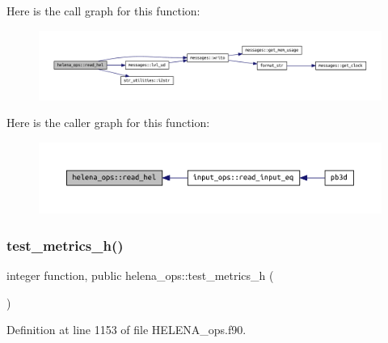 Here is the call graph for this function\+:
\nopagebreak
\begin{figure}[H]
\begin{center}
\leavevmode
\includegraphics[width=350pt]{namespacehelena__ops_ae05ba1182eb002d93c27ca4ff7ab8cf2_cgraph}
\end{center}
\end{figure}
Here is the caller graph for this function\+:
\nopagebreak
\begin{figure}[H]
\begin{center}
\leavevmode
\includegraphics[width=350pt]{namespacehelena__ops_ae05ba1182eb002d93c27ca4ff7ab8cf2_icgraph}
\end{center}
\end{figure}
\mbox{\label{namespacehelena__ops_a0f156b3653264fb016d6d311eb59114c}} 
\subsubsection{\texorpdfstring{test\+\_\+metrics\+\_\+h()}{test\_metrics\_h()}}
{\footnotesize\ttfamily integer function, public helena\+\_\+ops\+::test\+\_\+metrics\+\_\+h (\begin{DoxyParamCaption}{ }\end{DoxyParamCaption})}



Definition at line 1153 of file H\+E\+L\+E\+N\+A\+\_\+ops.\+f90.

